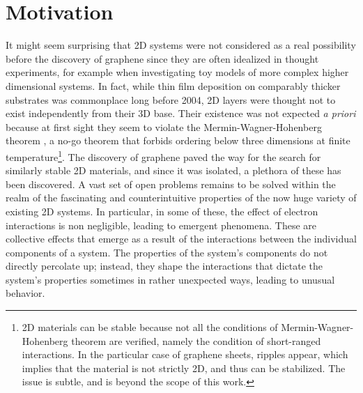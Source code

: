 \section{Motivation}
\label{sec:motivation}

It might seem surprising that \ac{2D} systems were not considered as a real possibility before the discovery of graphene since they are often idealized in thought experiments, for example when investigating toy models of more complex higher dimensional systems.
In fact, while thin film deposition on comparably thicker substrates was commonplace long before 2004, \ac{2D} layers were thought not to exist independently from their 3D base.
Their existence was not expected \emph{a priori} because at first sight they seem to violate the Mermin-Wagner-Hohenberg theorem \cite{mermin_absence_1966, coleman_there_1973, hohenberg_existence_1967}, a no-go theorem that forbids ordering below three dimensions at finite temperature\footnote{\ac{2D} materials can be stable because not all the conditions of Mermin-Wagner-Hohenberg theorem are verified, namely the condition of short-ranged interactions. In the particular case of graphene sheets, ripples appear, which implies that the material is not strictly \ac{2D}, and thus can be stabilized. The issue is subtle, and is beyond the scope of this work.}.
The discovery of graphene paved the way for the search for similarly stable \ac{2D} materials, and since it was isolated, a plethora of these has been discovered.
A vast set of open problems remains to be solved within the realm of the fascinating and counterintuitive properties of the now huge variety of existing \ac{2D} systems.
In particular, in some of these, the effect of electron interactions is non negligible, leading to emergent phenomena.
These are collective effects that emerge as a result of the interactions between the individual components of a system.
The properties of the system's components do not directly percolate up; instead, they shape the interactions that dictate the system's properties sometimes in rather unexpected ways, leading to unusual behavior.

